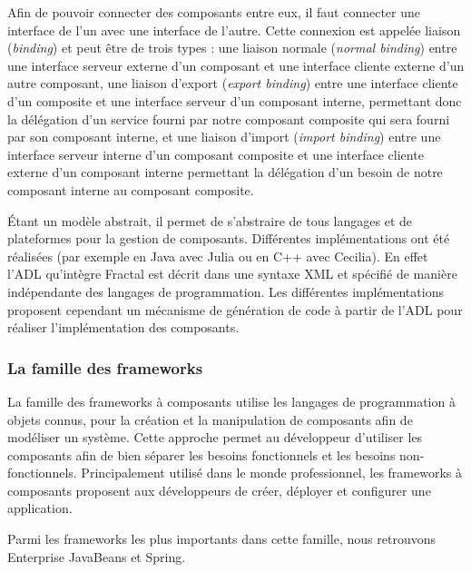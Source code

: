         Afin de pouvoir connecter des composants entre eux, il faut connecter une interface de l'un avec une interface de l'autre. Cette connexion est appelée liaison (\emph{binding}) et peut être de trois types : une liaison normale (\emph{normal binding}) entre une interface serveur externe d'un composant et une interface cliente externe d'un autre composant, une liaison d'export (\emph{export binding}) entre une interface cliente d'un composite et une interface serveur d'un composant interne, permettant donc la délégation d'un service fourni par notre composant composite qui sera fourni par son composant interne, et une liaison d'import (\emph{import binding}) entre une interface serveur interne d'un composant composite et une interface cliente externe d'un composant interne permettant la délégation d'un besoin de notre composant interne au composant composite.
        
        Étant un modèle abstrait, il permet de s'abstraire de tous langages et de plateformes pour la gestion de composants. Différentes implémentations ont été réalisées (par exemple en Java avec Julia ou en C++ avec Cecilia). En effet l'ADL qu’intègre Fractal est décrit dans une syntaxe XML et spécifié de manière indépendante des langages de programmation. Les différentes implémentations proposent cependant un mécanisme de génération de code à partir de l'ADL pour réaliser l'implémentation des composants. \\\par

    \subsubsection{La famille des frameworks}     
   
    La famille des frameworks à composants utilise les langages de programmation à objets connus, pour la création et la manipulation de composants afin de modéliser un système. Cette approche permet au développeur d'utiliser les composants afin de bien séparer les besoins fonctionnels et les besoins non-fonctionnels. Principalement utilisé dans le monde professionnel, les frameworks à composants proposent aux développeurs de créer, déployer et configurer une application.  \\\par
    
    Parmi les frameworks les plus importants dans cette famille, nous retrouvons Enterprise JavaBeans et Spring. \\\par
    
